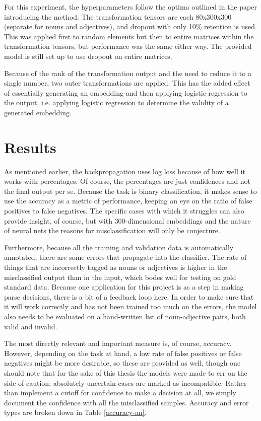 \documentclass[a4paper, 12pt]{scrartcl}
\begin{document}
For this experiment, the hyperparameters follow the optima outlined in the paper introducing the method. The transformation tensors are each 80x300x300 (separate for nouns and adjectives), and dropout with only 10\% retention is used. This was applied first to random elements but then to entire matrices within the transformation tensors, but performance was the same either way. The provided model is still set up to use dropout on entire matrices.

Because of the rank of the transformation output and the need to reduce it to a single number, two outer transformations are applied. This has the added effect of essentially generating an embedding and then applying logistic regression to the output, i.e. applying logistic regression to determine the validity of a generated embedding.


\section{Results}

As mentioned earlier, the backpropagation uses log loss because of how well it works with percentages. Of course, the percentages are just confidences and not the final output per se. Because the task is binary classification, it makes sense to use the accuracy as a metric of performance, keeping an eye on the ratio of false positives to false negatives. The specific cases with which it struggles can also provide insight, of course, but with 300-dimensional embeddings and the nature of neural nets the reasons for misclassification will only be conjecture.

Furthermore, because all the training and validation data is automatically annotated, there are some errors that propagate into the classifier. The rate of things that are incorrectly tagged as nouns or adjectives is higher in the misclassified output than in the input, which bodes well for testing on gold standard data. Because one application for this project is as a step in making parse decisions, there is a bit of a feedback loop here. In order to make sure that it will work correctly and has not been trained too much on the errors, the model also needs to be evaluated on a hand-written list of noun-adjective pairs, both valid and invalid.

The most directly relevant and important measure is, of course, accuracy. However, depending on the task at hand, a low rate of false positives or false negatives might be more desirable, so these are provided as well, though one should note that for the sake of this thesis the models were made to err on the side of caution; absolutely uncertain cases are marked as incompatible. Rather than implement a cutoff for confidence to make a decision at all, we simply document the confidence with all the misclassified samples. Accuracy and error types are broken down in Table \ref{accuracy-an}.
\end{document}
